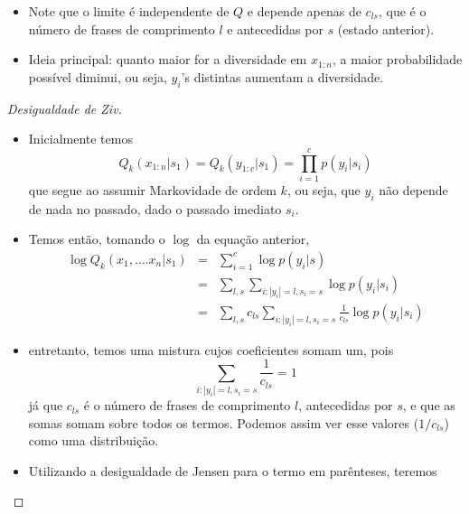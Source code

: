 \begin{frame}[allowframebreaks]
  \begin{itemize}
  \item Note que o limite é independente de $Q$ e depende apenas de $c_{ls}$, que é o 
	número de frases de comprimento $l$ e antecedidas por $s$ (estado anterior).
  \item Ideia principal: quanto maior for a diversidade em $x_{1:n}$, a maior probabilidade
	possível diminui, ou seja, $y_i$'s distintas aumentam a diversidade.
  \end{itemize}


  \begin{proof}[Desigualdade de Ziv]
  \begin{itemize}
  \item Inicialmente temos
	\begin{equation}
	Q_k(x_{1:n}|s_1) = Q_k(y_{1:c} | s_1) = \prod_{i=1}^c p(y_i | s_i)
	\end{equation}
  que segue ao assumir Markovidade de ordem $k$, ou seja, que $y_i$ não depende de
  nada no passado, dado o passado imediato $s_i$.
  \end{itemize}
  \proofbreak
  \begin{itemize}
  \item Temos então, tomando o $\log$ da equação anterior,
	\begin{eqnarray} 
	\log Q_k (x_1, \ldots. x_n | s_1) &=& \sum_{i=1}^{c} \log p(y_i | s) \nonumber \\
		&=& \sum_{l,s} \sum_{i: |y_i| = l, s_i = s} \log p(y_i | s_i) \nonumber \\
		&=& \sum_{l,s} c_{ls} \sum_{i: |y_i| = l, s_i = s} \frac{1}{c_{ls}} \log p(y_i | s_i)
	\end{eqnarray}
  \end{itemize}
  \proofbreak
  \begin{itemize}
  \item entretanto, temos uma mistura cujos coeficientes somam um, pois
	\begin{equation}
	\sum_{i: |y_i| = l, s_i = s} \frac{1}{c_{ls}} = 1
	\end{equation}
	já que $c_{ls}$ é o número de frases de comprimento $l$, antecedidas por $s$,
	e que as somas somam sobre todos os termos. Podemos assim ver esse valores ($1/c_{ls}$)
 	como uma distribuição.
  \end{itemize}
  \proofbreak
  \begin{itemize}
  \item Utilizando a desigualdade de Jensen para o termo em parênteses, teremos
	\begin{equation}

\end{equation}
\end{itemize}
\end{proof}
\end{frame}
